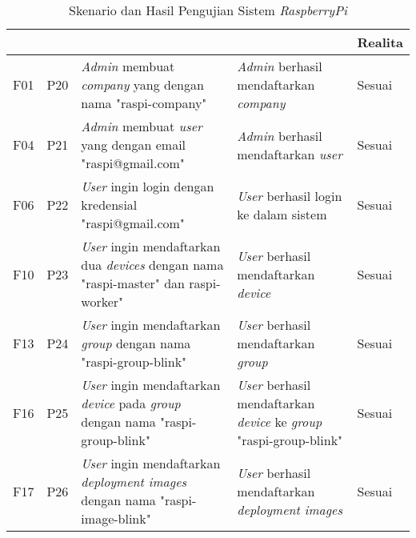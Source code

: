 \bgroup
\begin{table}[ht]
  \def\arraystretch{1.3}
  \caption{Skenario dan Hasil Pengujian Sistem \textit{RaspberryPi}}
  \label{tab:pengujian-sistem-raspi}
  \centering
  \begin{tabular}{|p{2cm}|p{2cm}|p{3cm}|p{3cm}|p{1.5cm}|}
    \hline
    \centering{ID Fungsional} & \centering{ID Pengujian}                            & \centering{Skenario}                                                                                 & \centering{Ekspektasi}                                                                    & Realita \\
    \hline
    F01                       & P20                                                 & \textit{Admin} membuat \textit{company} yang dengan nama "raspi-company"                             & \textit{Admin} berhasil mendaftarkan \textit{company}                                     & Sesuai  \\
    \hline
    F04                       & P21                                                 & \textit{Admin} membuat \textit{user} yang dengan email "raspi@gmail.com"                             & \textit{Admin} berhasil mendaftarkan \textit{user}                                        & Sesuai  \\
    \hline
    F06                       & P22                                                 & \textit{User} ingin login dengan kredensial "raspi@gmail.com"                                        & \textit{User} berhasil login ke dalam sistem                                              & Sesuai  \\
    \hline
    F10                       & P23                                                 & \textit{User} ingin mendaftarkan dua \textit{devices} dengan nama "raspi-master" dan
    raspi-worker"             & \textit{User} berhasil mendaftarkan \textit{device} & Sesuai                                                                                                                                                                                                     \\
    \hline
    F13                       & P24                                                 & \textit{User} ingin mendaftarkan \textit{group} dengan nama "raspi-group-blink"                      & \textit{User} berhasil mendaftarkan \textit{group}                                        & Sesuai  \\
    \hline
    F16                       & P25                                                 & \textit{User} ingin mendaftarkan \textit{device} pada \textit{group} dengan nama "raspi-group-blink" & \textit{User} berhasil mendaftarkan \textit{device} ke \textit{group} "raspi-group-blink" & Sesuai  \\
    \hline
    F17                       & P26                                                 & \textit{User} ingin mendaftarkan \textit{deployment images} dengan nama "raspi-image-blink"          & \textit{User} berhasil mendaftarkan \textit{deployment images}                            & Sesuai  \\
    \hline
  \end{tabular}
\end{table}
\egroup

